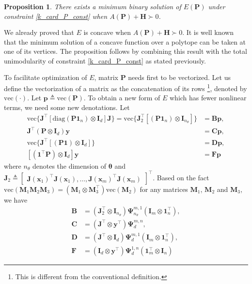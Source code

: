 \documentclass[11pt,bezier,]{article}
\newtheorem{proposition}{Proposition}
\begin{document}
\begin{proposition} \label{prop_2}
There exists a minimum binary solution of
$E(\mathbf P)$  under  constraint \eqref{k_card_P_const} when $A(\mathbf P)+\mathbf H\succ0$.
\end{proposition}
{\proof
We already proved that $E$ is concave when $A(\mathbf P)+\mathbf H\succ0$.
 It is well known that the minimum solution of a concave
function over a polytope can be taken at one of its vertices.
The proposition follows by combining this result with the
total unimodularity of  constraint \eqref{k_card_P_const} as stated previously.
}



To facilitate  optimization of $E$,
matrix $\mathbf P$ needs first to be  vectorized. 
Let us define the vectorization of a matrix as the concatenation of its rows
\footnote{This  is different from the conventional definition. }, 
denoted by $\text{vec}(\cdot)$. 
Let $\mathbf p\triangleq \text{vec}(\mathbf P)$. 
To obtain a new form of $E$ which has fewer nonlinear terms, 
we need some new denotations. 
Let
\begin{align*}
\text{vec}\{  \mathbf J^\top [\text{diag}(\mathbf P  \mathbf 1_n) \otimes \mathbf I_d]\mathbf J \} =
 \text{vec}\{ \mathbf J_2^\top [ (\mathbf P  \mathbf 1_n) \otimes \mathbf I_{n_\theta}] \} &=\mathbf B\mathbf p,\\
  \mathbf J^\top (\mathbf P\otimes \mathbf I_d)\mathbf y &=\mathbf C\mathbf p,\\
  \text{vec} \{ \mathbf J^\top[(\mathbf P\mathbf 1)\otimes \mathbf I_d] \} &=\mathbf D\mathbf p, \\
   [(\mathbf 1^\top\mathbf P)\otimes \mathbf I_d]\mathbf y &=\mathbf F\mathbf p
 \end{align*}
where $n_\theta$ denotes the dimension of ${\boldsymbol\theta}$ and 
$
 \mathbf J_2\triangleq\begin{bmatrix}
      \mathbf J(\mathbf x_1)^\top \mathbf J(\mathbf x_1),       \ldots,      \mathbf J(\mathbf x_m)^\top \mathbf J(\mathbf x_m)
     \end{bmatrix}^\top
$.
Based on the fact 
$\text{vec}(\mathbf M_1\mathbf M_2\mathbf M_3)
= (\mathbf M_1\otimes \mathbf M_3^\top)\text{vec}(\mathbf M_2)$
for any matrices $\mathbf M_1$, $\mathbf M_2$ and $\mathbf M_3$,
we have
\begin{align*}
\mathbf B&=(\mathbf J_2^\top\otimes \mathbf I_{n_\theta}) \boldsymbol\Psi^{m,1}_{n_\theta} (\mathbf I_m \otimes\mathbf 1_n^\top),\\
\mathbf C&=(\mathbf J^\top\otimes\mathbf y^\top)\boldsymbol\Psi^{m,n}_d, \\
\mathbf D&=(\mathbf J^\top\otimes \mathbf I_d) \boldsymbol\Psi^{m,1}_d (\mathbf I_m\otimes \mathbf 1_n^\top),\\
\mathbf F&=(\mathbf I_d\otimes \mathbf y^\top) \boldsymbol\Psi^{1,n}_d (\mathbf 1_m^\top\otimes \mathbf I_n)
\end{align*}
\end{document}
